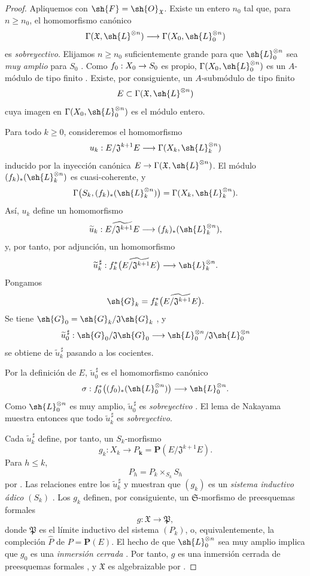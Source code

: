 \documentclass[oneside]{amsart}
\makeatletter
\renewcommand{\leq}{\leqslant}
\renewcommand{\geq}{\geqslant}
\newcommand{\ega@arrow}[2]{\mathchoice{#1}{#2}{#2}{#2}}
\renewcommand{\to}{\ega@arrow{\longrightarrow}{\rightarrow}}
\makeatother
\begin{document}
\begin{proof}
Apliquemos  con
$\sh{F}=\sh{O}_{\mathfrak{X}}$. Existe un entero $n_0$ tal
que, para $n\geq n_0$, el homomorfismo canónico
\[
  \Gamma(\mathfrak{X},\sh{L}^{\otimes n})
  \longrightarrow
  \Gamma(X_0,\sh{L}_0^{\otimes n})
\]
es \emph{sobreyectivo}. Elijamos $n\geq n_0$ suficientemente grande para que
$\sh{L}_0^{\otimes n}$ sea \emph{muy amplio} para $S_0$
. Como
$f_0:X_0\to S_0$ es propio,
$\Gamma(X_0,\sh{L}_0^{\otimes n})$ es un $A$-módulo de tipo finito
. Existe, por consiguiente, un
$A$-submódulo de tipo finito
\[
  E\subset\Gamma(\mathfrak{X},\sh{L}^{\otimes n})
\]
cuya imagen en $\Gamma(X_0,\sh{L}_0^{\otimes n})$ es el módulo
entero.

Para todo $k\geq0$, consideremos el homomorfismo
\[
  u_k:
  E/\mathfrak{J}^{k+1}E
  \longrightarrow
  \Gamma(X_k,\sh{L}_k^{\otimes n})
\]
inducido por la inyección canónica
$E\to\Gamma(\mathfrak{X},\sh{L}^{\otimes n})$. El módulo
$(f_k)_*(\sh{L}_k^{\otimes n})$ es cuasi-coherente, y
\[
  \Gamma\bigl(S_k,(f_k)_*(\sh{L}_k^{\otimes n})\bigr)
  =
  \Gamma(X_k,\sh{L}_k^{\otimes n}).
\]
Así, $u_k$ define un homomorfismo
\[
  \widetilde{u}_k:
  \widetilde{E/\mathfrak{J}^{k+1}E}
  \longrightarrow
  (f_k)_*(\sh{L}_k^{\otimes n}),
\]
y, por tanto, por adjunción, un homomorfismo
\[
  \widetilde{u}_k^{\,\sharp}:
  f_k^*\bigl(\widetilde{E/\mathfrak{J}^{k+1}E}\bigr)
  \longrightarrow
  \sh{L}_k^{\otimes n}.
\]
Pongamos
\[
  \sh{G}_k=
  f_k^*\bigl(\widetilde{E/\mathfrak{J}^{k+1}E}\bigr).
\]
Se tiene
$\sh{G}_0=\sh{G}_k/\mathfrak{J}\sh{G}_k$
, y
\[
  \widetilde{u}_0^{\,\sharp}:
  \sh{G}_0/\mathfrak{J}\sh{G}_0
  \longrightarrow
  \sh{L}_0^{\otimes n}/
  \mathfrak{J}\sh{L}_0^{\otimes n}
\]
se obtiene de $\widetilde{u}_k^{\,\sharp}$ pasando a los
cocientes.

Por la definición de $E$, $\widetilde{u}_0^{\,\sharp}$ es el
homomorfismo canónico
\[
  \sigma:
  f_0^*\bigl((f_0)_*(\sh{L}_0^{\otimes n})\bigr)
  \longrightarrow
  \sh{L}_0^{\otimes n}.
\]
Como $\sh{L}_0^{\otimes n}$ es muy amplio,
$\widetilde{u}_0^{\,\sharp}$ es \emph{sobreyectivo}
. El lema de Nakayama muestra entonces que todo
$\widetilde{u}_k^{\,\sharp}$ es \emph{sobreyectivo}.

Cada $\widetilde{u}_k^{\,\sharp}$ define, por tanto,
 un $S_k$-morfismo
\[
  g_k:X_k\longrightarrow
  P_{\boldsymbol{k}}=\mathbf{P}(E/\mathfrak{J}^{k+1}E).
\]
Para $h\leq k$,
\[
  P_h=P_k\times_{S_k}S_h
\]
por . Las relaciones entre los
$\widetilde{u}_k^{\,\sharp}$ y  muestran que
$(g_k)$ es un \emph{sistema inductivo ádico} $(S_k)$
. Los $g_k$ definen, por consiguiente, un
$\mathfrak{S}$-morfismo de preesquemas formales
\[
  g:\mathfrak{X}\longrightarrow\mathfrak{P},
\]
donde $\mathfrak{P}$ es el límite inductivo del sistema $(P_k)$,
o, equivalentemente, la compleción $\widehat{P}$ de
$P=\mathbf{P}(E)$. El hecho de que
$\sh{L}_0^{\otimes n}$ sea muy amplio implica que $g_0$ es una \emph{inmersión cerrada}
. Por tanto, $g$ es una inmersión cerrada de
preesquemas formales , y $\mathfrak{X}$ es algebraizable
por .


\end{proof}
\end{document}
